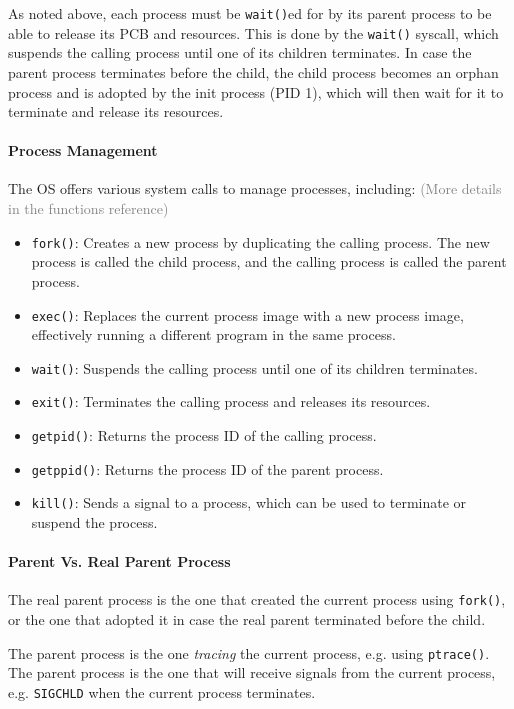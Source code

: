 \documentclass[openany,12pt]{book}
\newcommand{\code}[1]{\texttt{#1}}
\newcommand{\gray}[1]{\textcolor{gray}{#1}}
\begin{document}
\vspace{1em}

As noted above, each process must be \code{wait()}ed for by its parent process to be able to release its PCB and resources. This is done by the \texttt{wait()} syscall, which suspends the calling process until one of its children terminates. In case {\color{red} the parent process terminates before the child}, the child process {\color{red} becomes an orphan process and is adopted by the init process (PID 1)}, which will then wait for it to terminate and release its resources.


\paragraph{Process Management} The OS offers various system calls to manage processes, including: \gray{(More details in the functions reference)}
\begin{itemize}
  \item \texttt{fork()}: Creates a new process by duplicating the calling process. The new process is called the child process, and the calling process is called the parent process.
  \item \texttt{exec()}: Replaces the current process image with a new process image, effectively running a different program in the same process.
  \item \texttt{wait()}: Suspends the calling process until one of its children terminates.
  \item \texttt{exit()}: Terminates the calling process and releases its resources.
  \item \texttt{getpid()}: Returns the process ID of the calling process.
  \item \texttt{getppid()}: Returns the process ID of the parent process.
  \item \texttt{kill()}: Sends a signal to a process, which can be used to terminate or suspend the process.
\end{itemize}

\paragraph{Parent Vs. Real Parent Process}
The real parent process is the one that created the current process using \code{fork()}, or the one that adopted it in case the real parent terminated before the child.

The parent process is the one \textit{tracing} the current process, e.g. using \code{ptrace()}. The parent process is the one that will receive signals from the current process, e.g. \texttt{SIGCHLD} when the current process terminates.
\end{document}
